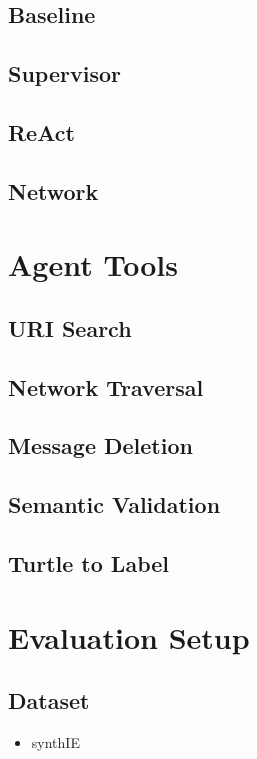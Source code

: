 \documentclass[a4paper,oneside,bibliography=totoc]{scrbook}
\begin{document}
\subsection{Baseline}
\label{subsec:baseline}
\subsection{Supervisor}
\label{subsec:supervisor}
\subsection{ReAct}
\label{subsec:react}
\subsection{Network}
\label{subsec:network}

\section{Agent Tools}
\label{sec:agent_tools}
\subsection{URI Search}
\label{subsec:uri_search}
\subsection{Network Traversal}
\label{subsec:network_traversal}
\subsection{Message Deletion}
\label{subsec:message_deletion}
\subsection{Semantic Validation}
\label{subsec:semantic_validation}
\subsection{Turtle to Label}
\label{subsec:turtle_to_label}
\section{Evaluation Setup}
\label{sec:evaluation_setup}
\subsection{Dataset}
\label{sec:dataset}
\begin{itemize}
  \item synthIE
\end{itemize}
\end{document}
